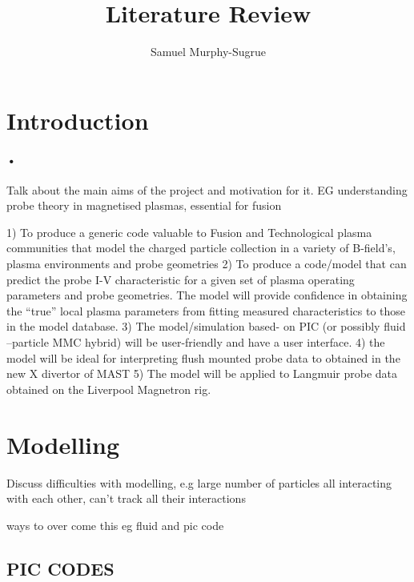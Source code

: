 \documentclass[12pt]{article}
\begin{document}
%

\title{Literature Review}
\author{Samuel Murphy-Sugrue\\}

\maketitle



\section{Introduction}
\paragraph{•}
Talk about the main aims of the project and motivation for it. EG understanding probe theory in magnetised plasmas, essential for fusion

1)  To produce a generic code valuable to Fusion and Technological plasma communities that model the charged particle collection in a variety of B-field’s, plasma environments and probe geometries
2) To produce a code/model that can predict the probe I-V characteristic for a given set of plasma operating parameters and probe geometries. The model will provide confidence in obtaining the “true”  local plasma parameters from  fitting measured characteristics to those in the model database.
3) The model/simulation based- on PIC  (or possibly fluid –particle MMC hybrid) will be user-friendly and have a user interface. 
4) the model will be ideal for interpreting flush mounted probe data to obtained in the new X divertor of MAST
5) The model will be applied to Langmuir probe data obtained on the Liverpool Magnetron rig. 




\section{Modelling} 
Discuss difficulties with modelling, e.g large number of particles all interacting with each other, can't track all their interactions 

ways to over come this eg fluid and pic code 

\subsection{PIC CODES} 
\end{document}
